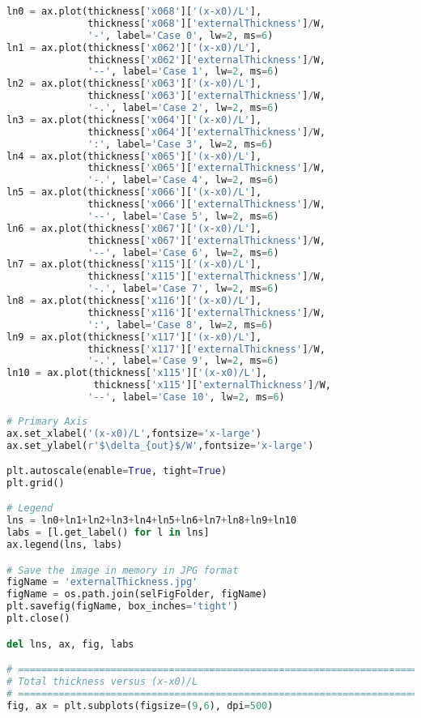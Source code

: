 \begin{lstlisting}[language=python]
ln0 = ax.plot(thickness['x068']['(x-x0)/L'],
              thickness['x068']['externalThickness']/W,
              '-', label='Case 0', lw=2, ms=6)
ln1 = ax.plot(thickness['x062']['(x-x0)/L'],
              thickness['x062']['externalThickness']/W,
              '--', label='Case 1', lw=2, ms=6)
ln2 = ax.plot(thickness['x063']['(x-x0)/L'],
              thickness['x063']['externalThickness']/W,
              '-.', label='Case 2', lw=2, ms=6)
ln3 = ax.plot(thickness['x064']['(x-x0)/L'],
              thickness['x064']['externalThickness']/W,
              ':', label='Case 3', lw=2, ms=6)
ln4 = ax.plot(thickness['x065']['(x-x0)/L'],
              thickness['x065']['externalThickness']/W,
              '-.', label='Case 4', lw=2, ms=6)
ln5 = ax.plot(thickness['x066']['(x-x0)/L'],
              thickness['x066']['externalThickness']/W,
              '--', label='Case 5', lw=2, ms=6)
ln6 = ax.plot(thickness['x067']['(x-x0)/L'],
              thickness['x067']['externalThickness']/W,
              '--', label='Case 6', lw=2, ms=6)
ln7 = ax.plot(thickness['x115']['(x-x0)/L'],
              thickness['x115']['externalThickness']/W,
              '-.', label='Case 7', lw=2, ms=6)
ln8 = ax.plot(thickness['x116']['(x-x0)/L'],
              thickness['x116']['externalThickness']/W,
              ':', label='Case 8', lw=2, ms=6)
ln9 = ax.plot(thickness['x117']['(x-x0)/L'],
              thickness['x117']['externalThickness']/W,
              '-.', label='Case 9', lw=2, ms=6)
ln10 = ax.plot(thickness['x115']['(x-x0)/L'],
               thickness['x115']['externalThickness']/W,
              '--', label='Case 10', lw=2, ms=6)
    
# Primary Axis
ax.set_xlabel('(x-x0)/L',fontsize='x-large')
ax.set_ylabel(r'$\delta_{out}$/W',fontsize='x-large')

plt.autoscale(enable=True, tight=True)
plt.grid()

# Legend
lns = ln0+ln1+ln2+ln3+ln4+ln5+ln6+ln7+ln8+ln9+ln10
labs = [l.get_label() for l in lns]
ax.legend(lns, labs)

# Save the image in memory in JPG format
figName = 'externalThickness.jpg'
figName = os.path.join(selFigFolder, figName)
plt.savefig(figName, box_inches='tight')
plt.close()

del lns, ax, fig, labs

# =============================================================================
# Total thickness versus (x-x0)/L
# =============================================================================
fig, ax = plt.subplots(figsize=(9,6), dpi=500)


\end{lstlisting}
